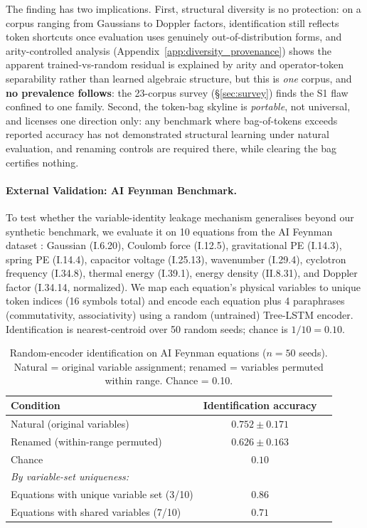 The finding has two implications. First, structural diversity is no protection: on a corpus ranging from Gaussians to Doppler factors, identification still reflects token shortcuts once evaluation uses genuinely out-of-distribution forms, and arity-controlled analysis (Appendix~\ref{app:diversity_provenance}) shows the apparent trained-vs-random residual is explained by arity and operator-token separability rather than learned algebraic structure, but this is \emph{one} corpus, and \textbf{no prevalence follows}: the 23-corpus survey (\S\ref{sec:survey}) finds the S1 flaw confined to one family. Second, the token-bag skyline is \emph{portable}, not universal, and licenses one direction only: any benchmark where bag-of-tokens exceeds reported accuracy has not demonstrated structural learning under natural evaluation, and renaming controls are required there, while clearing the bag certifies nothing.

\paragraph{External Validation: AI Feynman Benchmark.}
To test whether the variable-identity leakage mechanism generalises beyond our synthetic benchmark, we evaluate it on 10 equations from the AI Feynman dataset \citep{udrescu2020ai}: Gaussian (I.6.20), Coulomb force (I.12.5), gravitational PE (I.14.3), spring PE (I.14.4), capacitor voltage (I.25.13), wavenumber (I.29.4), cyclotron frequency (I.34.8), thermal energy (I.39.1), energy density (II.8.31), and Doppler factor (I.34.14, normalized). We map each equation's physical variables to unique token indices (16 symbols total) and encode each equation plus 4 paraphrases (commutativity, associativity) using a random (untrained) Tree-LSTM encoder. Identification is nearest-centroid over 50 random seeds; chance is $1/10 = 0.10$.

\begin{table}[h]
\centering
\caption{Random-encoder identification on AI Feynman equations ($n=50$ seeds). Natural = original variable assignment; renamed = variables permuted within range. Chance = 0.10.}
\label{tab:feynman}
\begin{tabular}{lcc}
\toprule
Condition & Identification accuracy \\
\midrule
Natural (original variables) & $0.752 \pm 0.171$ \\
Renamed (within-range permuted) & $0.626 \pm 0.163$ \\
Chance & $0.10$ \\
\midrule
\multicolumn{2}{l}{\emph{By variable-set uniqueness:}} \\
\quad Equations with unique variable set (3/10) & $0.86$ \\
\quad Equations with shared variables (7/10) & $0.71$ \\
\bottomrule
\end{tabular}
\end{table}

